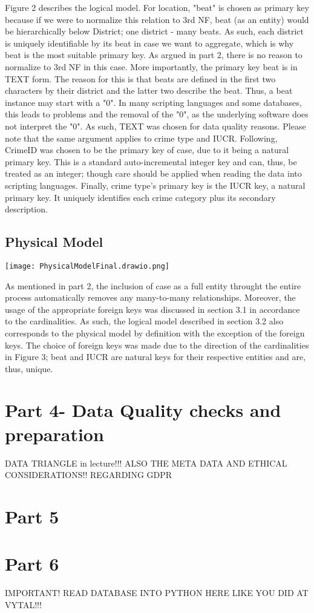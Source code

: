 \documentclass[a4paper]{article}
\begin{document}
Figure 2 describes the logical model. For location, "beat" is chosen as primary key because if we were to normalize this relation to 3rd NF, beat (as an entity) would be hierarchically below District; one district - many beats. As such, each district is uniquely identifiable by its beat in case we want to aggregate, which is why beat is the most suitable primary key. As argued in part 2, there is no reason to normalize to 3rd NF in this case. More importantly, the primary key beat is in TEXT form. The reason for this is that beats are defined in the first two characters by their district and the latter two describe the beat. Thus, a beat instance may start with a "0". In many scripting languages and some databases, this leads to problems and the removal of the "0", as the underlying software does not interpret the "0". As such, TEXT was chosen for data quality reasons. Please note that the same argument applies to crime type and IUCR. 
\indent Following, CrimeID was chosen to be the primary key of case, due to it being a natural primary key. This is a standard auto-incremental integer key and can, thus, be treated as an integer; though care should be applied when reading the data into scripting languages.
\indent Finally, crime type's primary key is the IUCR key, a natural primary key. It uniquely identifies each crime category plus its secondary description. 

\subsection{Physical Model}
\texttt{[image: PhysicalModelFinal.drawio.png]}

As mentioned in part 2, the inclusion of case as a full entity throught the entire process automatically removes any many-to-many relationships. Moreover, the usage of the appropriate foreign keys was discussed in section 3.1 in accordance to the cardinalities. As such, the logical model described in section 3.2 also corresponds to the physical model by definition with the exception of the foreign keys. The choice of foreign keys was made due to the direction of the cardinalities in Figure 3; beat and IUCR are natural keys for their respective entities and are, thus, unique.



\section{Part 4- Data Quality checks and preparation}


DATA TRIANGLE in lecture!!!
ALSO THE META DATA AND ETHICAL CONSIDERATIONS!! REGARDING GDPR 
\section{Part 5}






\section{Part 6}
IMPORTANT! READ DATABASE INTO PYTHON HERE LIKE YOU DID AT VYTAL!!!
\end{document}
